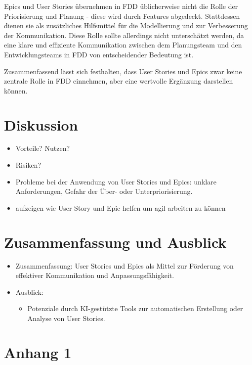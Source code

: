 \documentclass[acmtog]{acmart}
\begin{document}
Epics und User Stories übernehmen in FDD üblicherweise nicht die Rolle der Priorisierung und Planung - diese wird durch Features abgedeckt. Stattdessen dienen sie als zusätzliches Hilfsmittel für die Modellierung und zur Verbesserung der Kommunikation. Diese Rolle sollte allerdings nicht unterschätzt werden, da eine klare und effiziente Kommunikation zwischen dem Planungsteam und den Entwicklungsteams in FDD von entscheidender Bedeutung ist.

Zusammenfassend lässt sich festhalten, dass User Stories und Epics zwar keine zentrale Rolle in FDD einnehmen, aber eine wertvolle Ergänzung darstellen können.

\section{Diskussion}

\begin{itemize}
	\item Vorteile? Nutzen?
	\item Risiken?
	\item Probleme bei der Anwendung von User Stories und Epics: unklare Anforderungen, Gefahr der Über- oder Unterpriorisierung.
	\item aufzeigen wie User Story und Epic helfen um agil arbeiten zu können
\end{itemize}

\section{Zusammenfassung und Ausblick}

\begin{itemize}
	\item Zusammenfassung: User Stories und Epics als Mittel zur Förderung von effektiver Kommunikation und Anpassungsfähigkeit.
	\item Ausblick:
	      \begin{itemize}
		      \item Potenziale durch KI-gestützte Tools zur automatischen Erstellung oder Analyse von User Stories.
	      \end{itemize}
\end{itemize}





\appendix

\section{Anhang 1}
\end{document}
